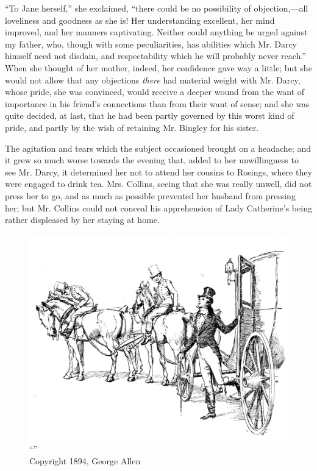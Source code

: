 ``To Jane herself,'' she exclaimed, ``there could be no possibility of objection,---all loveliness and goodness as she is! Her understanding excellent, her mind improved, and her manners captivating. Neither could anything be urged against my father, who, though with some peculiarities, has abilities which Mr. Darcy himself need not disdain, and respectability which he will probably never reach.'' When she thought of her mother, indeed, her confidence gave way a little; but she would not allow that any objections \textit{there} had material weight with Mr. Darcy, whose pride, she was convinced, would receive a deeper wound from the want of importance in his friend's connections than from their want of sense; and she was quite decided, at last, that he had been partly governed by this worst kind of pride, and partly by the wish of retaining Mr. Bingley for his sister.

The agitation and tears which the subject occasioned brought on a headache; and it grew so much worse towards the evening that, added to her unwillingness to see Mr. Darcy, it determined her not to attend her cousins to Rosings, where they were engaged to drink tea. Mrs. Collins, seeing that she was really unwell, did not press her to go, and as much as possible prevented her husband from pressing her; but Mr. Collins could not conceal his apprehension of Lady Catherine's being rather displeased by her staying at home.

\begin{figure}[htbp]
    \centering
    \includegraphics[width=\textwidth]{illustrations/i_031.jpg}
    \caption{“”\\ Copyright 1894, George Allen}
    \label{fig:image}
\end{figure}



